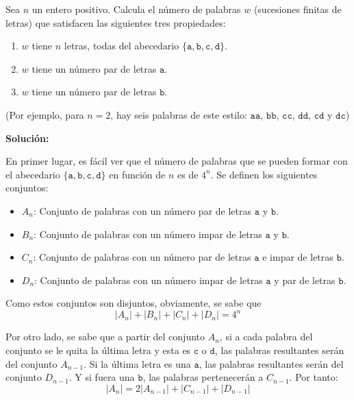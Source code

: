 \documentclass[../../main.tex]{subfiles}
\begin{document}
  \begin{shaded}
    Sea $n$ un entero positivo. Calcula el número de palabras $w$ (sucesiones finitas de letras) que satisfacen las siguientes tres propiedades:

    \begin{enumerate}
      \item $w$ tiene $n$ letras, todas del abecedario $\{\mathtt{a}, \mathtt{b}, \mathtt{c}, \mathtt{d}\}$.
      \item $w$ tiene un número par de letras $\mathtt{a}$.
      \item $w$ tiene un número par de letras $\mathtt{b}$.
    \end{enumerate}

    (Por ejemplo, para $n = 2$, hay seis palabras de este estilo: $\mathtt{aa}$, $\mathtt{bb}$, $\mathtt{cc}$, $\mathtt{dd}$, $\mathtt{cd}$ y $\mathtt{dc}$)
  \end{shaded}

  \textbf{Solución:}

  En primer lugar, es fácil ver que el número de palabras que se pueden formar con el abecedario $\{\mathtt{a}, \mathtt{b}, \mathtt{c}, \mathtt{d}\}$ en función de $n$ es de $4^n$. Se definen los siguientes conjuntos:

  \begin{itemize}
    \item $A_n$: Conjunto de palabras con un número par de letras $\mathtt{a}$ y $\mathtt{b}$.
    \item $B_n$: Conjunto de palabras con un número impar de letras $\mathtt{a}$ y $\mathtt{b}$.
    \item $C_n$: Conjunto de palabras con un número par de letras $\mathtt{a}$ e impar de letras $\mathtt{b}$.
    \item $D_n$: Conjunto de palabras con un número impar de letras $\mathtt{a}$ y par de letras $\mathtt{b}$.
  \end{itemize}

  Como estos conjuntos son disjuntos, obviamente, se sabe que
  $$
  |A_n| + |B_n| + |C_n| + |D_n| = 4^n
  $$

  Por otro lado, se sabe que a partir del conjunto $A_n$, si a cada palabra del conjunto se le quita la última letra y esta es $\mathtt{c}$ o $\mathtt{d}$, las palabras resultantes serán del conjunto $A_{n - 1}$. Si la última letra es una $\mathtt{a}$, las palabras resultantes serán del conjunto $D_{n - 1}$. Y si fuera una $\mathtt{b}$, las palabras pertenecerán a $C_{n - 1}$. Por tanto:
  $$
  |A_n| = 2 |A_{n - 1}| + |C_{n - 1}| + |D_{n - 1}|
  $$
\end{document}
